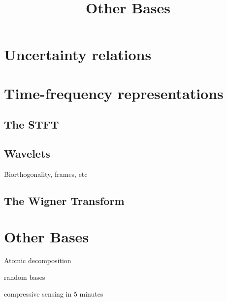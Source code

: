 


\title{Other Bases}


\maketitle




\section{Uncertainty relations}

\section{Time-frequency representations}

\subsection{The STFT}

\subsection{Wavelets}
Biorthogonality, frames, etc

\subsection{The Wigner Transform}


\section{Other Bases}
Atomic decomposition

random bases

compressive sensing in 5 minutes


